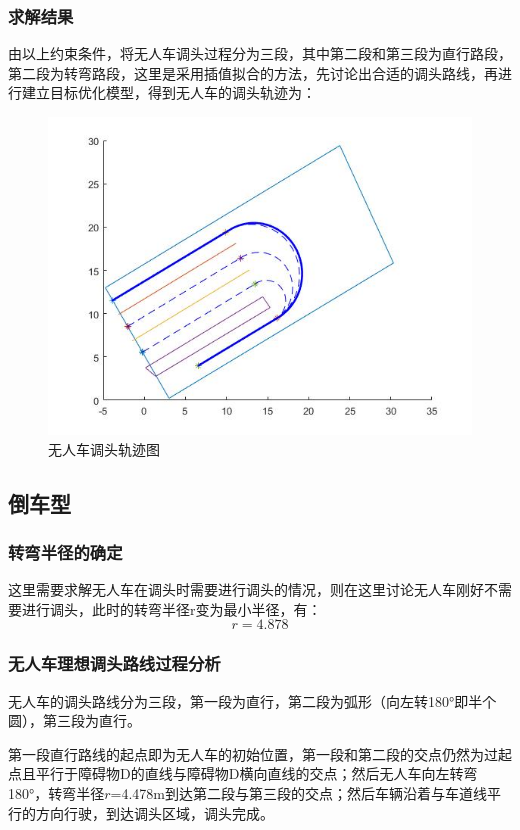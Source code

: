 \documentclass{article}
\begin{document}
\subsubsection{求解结果}
由以上约束条件，将无人车调头过程分为三段，其中第二段和第三段为直行路段，第二段为转弯路段，这里是采用插值拟合的方法，先讨论出合适的调头路线，再进行建立目标优化模型，得到无人车的调头轨迹为：
\begin{figure}[H]
    \centering
    \includegraphics[scale=0.5]{8.jpg}
    \caption{无人车调头轨迹图}
\end{figure}

\subsection{倒车型}
\subsubsection{转弯半径的确定}
这里需要求解无人车在调头时需要进行调头的情况，则在这里讨论无人车刚好不需要进行调头，此时的转弯半径r变为最小半径，有：
\begin{equation}
    r = 4.878
\end{equation}

\subsubsection{无人车理想调头路线过程分析}
无人车的调头路线分为三段，第一段为直行，第二段为弧形（向左转180°即半个圆），第三段为直行。

第一段直行路线的起点即为无人车的初始位置，第一段和第二段的交点仍然为过起点且平行于障碍物D的直线与障碍物D横向直线的交点；然后无人车向左转弯180°，转弯半径$r$=4.478m到达第二段与第三段的交点；然后车辆沿着与车道线平行的方向行驶，到达调头区域，调头完成。
\end{document}

